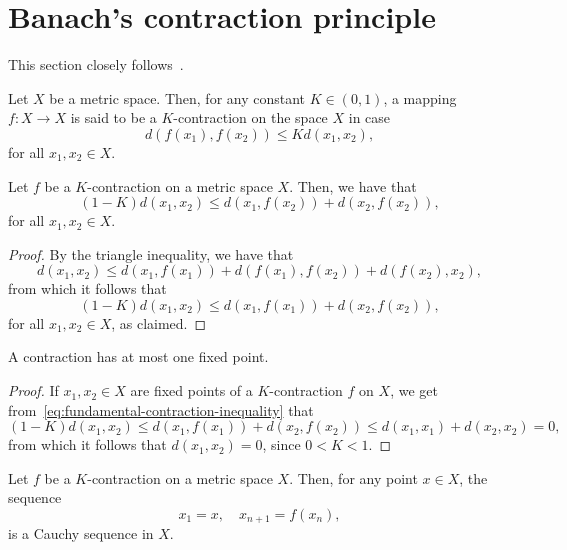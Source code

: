 \section{Banach's contraction principle}

This section closely follows~\cite{a_simple_proof_of_the_banach_contraction_principle}.

\begin{definition}\label{def:contracting-mapping}
  Let \(X\) be a metric space. Then, for any constant \(K\in(0,1)\), a mapping
  \(f:X\to{X}\) is said to be a \(K\)-contraction on the space \(X\) in case
  \[
    d(f(x_{1}),f(x_{2}))\leqslant{Kd(x_{1},x_{2})},
  \]
  for all \(x_{1},x_{2}\in{X}\).
\end{definition}

\begin{proposition}
  Let \(f\) be a \(K\)-contraction on a metric space \(X\). Then, we have that
  \begin{equation}\label{eq:fundamental-contraction-inequality}
    (1-K)d(x_{1},x_{2})\leqslant{d(x_{1},f(x_{2}))+d(x_{2},f(x_{2}))},
  \end{equation}
  for all \(x_{1},x_{2}\in{X}\).
\end{proposition}

\begin{proof}
  By the triangle inequality, we have that
  \[
    d(x_{1},x_{2})\leqslant{d(x_{1},f(x_{1}))+d(f(x_{1}),f(x_{2}))+d(f(x_{2}),x_{2})},
  \]
  from which it follows that
  \[
    (1-K)d(x_{1},x_{2})\leqslant{d(x_{1},f(x_{1}))+d(x_{2},f(x_{2}))},
  \]
  for all \(x_{1},x_{2}\in{X}\), as claimed.
\end{proof}

\begin{corollary}
  A contraction has at most one fixed point.
\end{corollary}

\begin{proof}
  If \(x_{1},x_{2}\in{X}\) are fixed points of a \(K\)-contraction \(f\) on
  \(X\), we get from~\eqref{eq:fundamental-contraction-inequality} that
  \[
    (1-K)d(x_{1},x_{2})
    \leqslant{d(x_{1},f(x_{1}))+d(x_{2},f(x_{2}))}
    \leqslant{d(x_{1},x_{1})+d(x_{2},x_{2})}
    =0,
  \]
  from which it follows that \(d(x_{1},x_{2})=0\), since \(0<K<1\).
\end{proof}

\begin{proposition}\label{proposition:the-iterates-of-any-point-under-a-contraction-is-always-a-cauchy-sequence}
  Let \(f\) be a \(K\)-contraction on a metric space \(X\). Then, for any point
  \(x\in{X}\), the sequence
  \[
    x_{1}=x,\quad{x_{n+1}=f(x_{n})},
  \]
  is a Cauchy sequence in \(X\).
\end{proposition}

